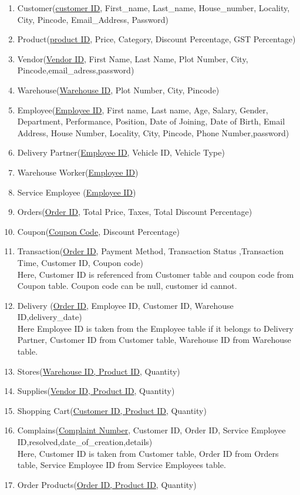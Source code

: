 \documentclass[12pt]{report}
\begin{document}
\begin{enumerate}
	\item Customer(\underline{customer ID}, First\_name, Last\_name, House\_number, Locality, City, Pincode, Email\_Address, Password)
	\item Product(\underline{product ID}, Price, Category, Discount Percentage, GST Percentage)
	\item Vendor(\underline{Vendor ID}, First Name, Last Name, Plot Number, City, Pincode,email\_adress,password)
	\item Warehouse(\underline{Warehouse ID}, Plot Number, City, Pincode)
	\item Employee(\underline{Employee ID}, First name, Last name, Age, Salary, Gender, Department, Performance, Position, Date of Joining, Date of Birth, Email Address, House Number, Locality, City, Pincode, Phone Number,password)
	\item Delivery Partner(\underline{Employee ID}, Vehicle ID, Vehicle Type)
	\item Warehouse Worker(\underline{Employee ID})
	\item Service Employee (\underline{Employee ID})
	\item Orders(\underline{Order ID}, Total Price, Taxes, Total Discount Percentage)
	\item Coupon(\underline{Coupon Code}, Discount Percentage)
	\item Transaction(\underline{Order ID}, Payment Method, Transaction Status ,Transaction Time, Customer ID, Coupon code)\\ Here, Customer ID is referenced from Customer table and coupon code from Coupon table. Coupon code can be null, customer id cannot.
	\item Delivery (\underline{Order ID}, Employee ID, Customer ID, Warehouse ID,delivery\_date) \\ Here Employee ID is taken from the Employee table if it belongs to Delivery Partner, Customer ID from Customer table, Warehouse ID from Warehouse table.
	\item Stores(\underline{Warehouse ID, Product ID}, Quantity)
	\item Supplies(\underline{Vendor ID, Product ID}, Quantity)
	\item Shopping Cart(\underline{Customer ID, Product ID}, Quantity)
	\item Complains(\underline{Complaint Number}, Customer ID, Order ID, Service Employee ID,resolved,date\_of\_creation,details)\\ Here, Customer ID is taken from Customer table, Order ID from Orders table, Service Employee ID from Service Employees table.
	\item Order Products(\underline{Order ID, Product ID}, Quantity)

\end{enumerate}
\end{document}
